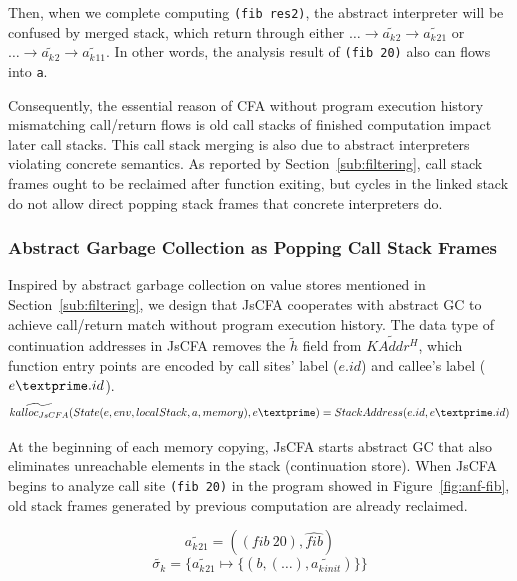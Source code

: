 \documentclass{article}
\begin{document}
Then, when we complete computing \verb|(fib res2)|, the abstract interpreter will be confused by merged stack, which return through either $\dots \to \widetilde{a_k{}_{2}} \to \widetilde{a_k{}_{21}}$ or $\dots \to \widetilde{a_k{}_{2}} \to \widetilde{a_k{}_{11}}$. In other words, the analysis result of \verb|(fib 20)| also can flows into \verb|a|.

Consequently, the essential reason of CFA without program execution history mismatching call/return flows is old call stacks of finished computation impact later call stacks. This call stack merging is also due to abstract interpreters violating concrete semantics. As reported by Section~\ref{sub:filtering}, call stack frames ought to be reclaimed after function exiting, but cycles in the linked stack do not allow direct popping stack frames that concrete interpreters do.

\subsubsection{Abstract Garbage Collection as Popping Call Stack Frames}
\label{subs:stack-gc}
Inspired by abstract garbage collection on value stores mentioned in Section~\ref{sub:filtering}, we design that JsCFA cooperates with abstract GC to achieve call/return match without program execution history. The data type of continuation addresses in JsCFA removes the $\tilde{h}$ field from $\widetilde{KAddr^H}$, which function entry points are encoded by call sites' label ($e.id$) and callee's label ($e\textprime .id$).
\[
\widetilde{kalloc_{JsCFA}}(State(e, env, localStack, a, memory), e\textprime) = StackAddress(e.id, e\textprime .id)
\]

At the beginning of each memory copying, JsCFA starts abstract GC that also eliminates unreachable elements in the stack (continuation store).
When JsCFA begins to analyze call site \verb|(fib 20)| in the program showed in Figure~\ref{fig:anf-fib}, old stack frames generated by previous computation are already reclaimed.

\[
\widetilde{a_k{}_{21}} = ((fib\ 20), \widehat{fib})
\]
\[
\widetilde{\sigma_k} = \{\widetilde{a_k{}_{21}} \mapsto \{(b, (\dots), \widetilde{a_k{}_{init}}) \} \}
\]
\end{document}
